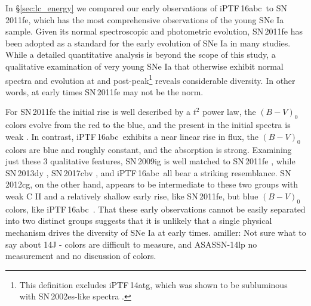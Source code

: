\documentclass[twocolumn]{aastex61}
\newcommand{\abc}{iPTF\,16abc}
\newcommand{\amiller}[1]{{\color{blue} amiller: {#1}}}
\begin{document}
In \S\ref{sec:lc_energy} we compared our early observations of \abc\ to SN\,2011fe, which has the most comprehensive observations of the young SNe Ia sample. Given its normal spectroscopic and photometric evolution, SN\,2011fe has been adopted as a standard for the early evolution of SNe Ia in many studies. While a detailed quantitative analysis is beyond the scope of this study, a qualitative examination of very young SNe Ia that otherwise exhibit normal spectra and evolution at and post-peak\footnote{This definition excludes iPTF\,14atg, which was shown to be subluminous with SN\,2002es-like spectra \citep{2015Natur.521..328C}.} reveals considerable diversity. In other words, at early times SN\,2011fe may not be the norm.

For SN\,2011fe the initial rise is well described by a $t^2$ power law, the $(B - V)_0$ colors evolve from the red to the blue, and the  present in the initial spectra is weak \citep{2011Natur.480..344N,2016ApJ...820...67Z,2012ApJ...752L..26P}. In contrast, \abc\ exhibits a near linear rise in flux, the $(B - V)_0$ colors are blue and roughly constant, and the  absorption is strong. Examining just these 3 qualitative features, SN\,2009ig is well matched to SN\,2011fe \citep{2012ApJ...744...38F}, while SN\,2013dy \citep{2013ApJ...778L..15Z}, SN\,2017cbv \citep{2017arXiv170608990H}, and \abc\ all bear a striking resemblance. SN\,2012cg, on the other hand, appears to be intermediate to these two groups with weak C II and a relatively shallow early rise, like SN\,2011fe, but blue $(B - V)_0$ colors, like \abc\ \citep{2012ApJ...756L...7S,2016ApJ...820...92M}. That these early observations cannot be easily separated into two distinct groups suggests that it is unlikely that a single physical mechanism drives the diversity of SNe Ia at early times.  \amiller{Not sure what to say about 14J - colors are difficult to measure, and ASASSN-14lp no \ion{C}{2} measurement and no discussion of colors}.
\end{document}

